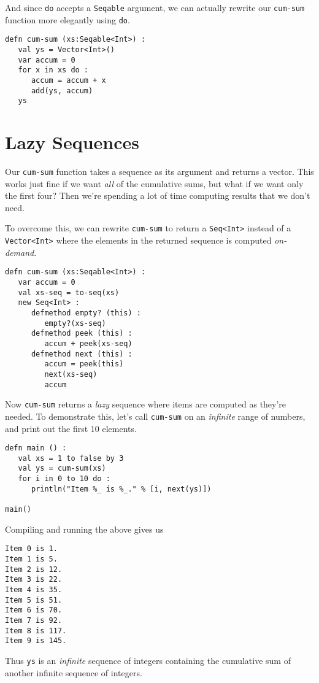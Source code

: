 \documentclass[10pt,oneside]{book}
\begin{document}
And since \texttt{\frenchspacing do} accepts a \texttt{\frenchspacing Seqable} argument, we can actually rewrite our \texttt{\frenchspacing cum-sum} function more elegantly using \texttt{\frenchspacing do}. 
\begin{lstlisting}
defn cum-sum (xs:Seqable<Int>) :
   val ys = Vector<Int>()
   var accum = 0
   for x in xs do :
      accum = accum + x
      add(ys, accum)
   ys
\end{lstlisting}

\section{Lazy Sequences}
Our \texttt{\frenchspacing cum-sum} function takes a sequence as its argument and returns a vector. This works just fine if we want {\em all} of the cumulative sums, but what if we want only the first four? Then we're spending a lot of time computing results that we don't need. 

To overcome this, we can rewrite \texttt{\frenchspacing cum-sum} to return a \texttt{\frenchspacing Seq<Int>} instead of a \texttt{\frenchspacing Vector<Int>} where the elements in the returned sequence is computed {\em on-demand}. 
\begin{lstlisting}
defn cum-sum (xs:Seqable<Int>) :
   var accum = 0
   val xs-seq = to-seq(xs)
   new Seq<Int> :
      defmethod empty? (this) :
         empty?(xs-seq)
      defmethod peek (this) :
         accum + peek(xs-seq)
      defmethod next (this) :
         accum = peek(this)
         next(xs-seq)
         accum
\end{lstlisting}
Now \texttt{\frenchspacing cum-sum} returns a {\em lazy} sequence where items are computed as they're needed. To demonstrate this, let's call \texttt{\frenchspacing cum-sum} on an {\em infinite} range of numbers, and print out the first 10 elements.
\begin{lstlisting}
defn main () :
   val xs = 1 to false by 3
   val ys = cum-sum(xs)
   for i in 0 to 10 do :
      println("Item %_ is %_." % [i, next(ys)])

main()
\end{lstlisting}
Compiling and running the above gives us
\begin{lstlisting}
Item 0 is 1.
Item 1 is 5.
Item 2 is 12.
Item 3 is 22.
Item 4 is 35.
Item 5 is 51.
Item 6 is 70.
Item 7 is 92.
Item 8 is 117.
Item 9 is 145.
\end{lstlisting}
Thus \texttt{\frenchspacing ys} is an {\em infinite} sequence of integers containing the cumulative sum of another infinite sequence of integers. 
\end{document}
